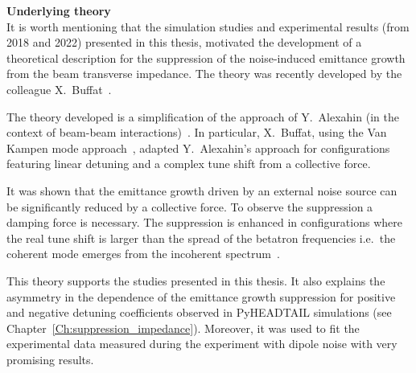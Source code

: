 \textbf{Underlying theory}\\
It is worth mentioning that the simulation studies and experimental results (from 2018 and 2022) presented in this thesis, motivated the development of a theoretical description for the suppression of the noise-induced emittance growth from the beam transverse impedance. The theory was recently developed by the colleague X.~Buffat~\cite{Buffat:2022dac, van_kamper_presentation_xavier_theory}. 

The theory developed is a simplification of the approach of Y.~Alexahin (in the context of beam-beam interactions)~\cite{Alexahin:485304}. In particular, X.~Buffat, using the Van Kampen mode approach~\cite{VANKAMPEN1955949}, adapted Y.~Alexahin's approach for configurations featuring linear detuning and a complex tune shift from a collective force. 

It was shown that the emittance growth driven by an external noise source can be significantly reduced by a collective force. To observe the suppression a damping force is necessary. The suppression is enhanced in configurations where the real tune shift is larger than the spread of the betatron frequencies i.e.~the coherent mode emerges from the incoherent spectrum~\cite{Buffat:2022dac}.

This theory supports the studies presented in this thesis. It also explains the asymmetry in the dependence of the emittance growth suppression for positive and negative detuning coefficients observed in PyHEADTAIL simulations (see Chapter~\ref{Ch:suppression_impedance}). Moreover, it was used to fit the experimental data measured during the experiment with dipole noise with very promising results.




